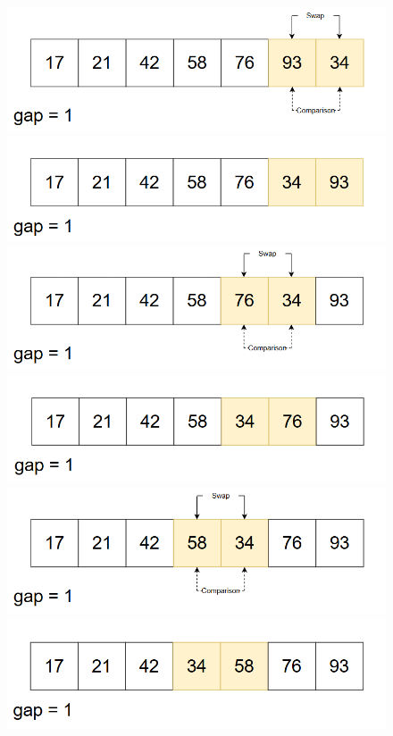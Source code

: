 \begin{figure}[H]
    \centering
    \includegraphics[width=0.5\linewidth]{img/shell_sort/18.png}
    \vspace{0.15cm}

    \includegraphics[width=0.5\linewidth]{img/shell_sort/19.png}
    \vspace{0.15cm}

    \includegraphics[width=0.5\linewidth]{img/shell_sort/20.png}
    \vspace{0.15cm}

    \includegraphics[width=0.5\linewidth]{img/shell_sort/21.png}
    \vspace{0.15cm}

    \includegraphics[width=0.5\linewidth]{img/shell_sort/22.png}
    \vspace{0.15cm}

    \includegraphics[width=0.5\linewidth]{img/shell_sort/23.png}
    \vspace{0.15cm}


\end{figure}
